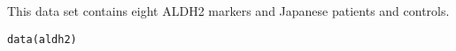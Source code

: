 \documentclass[a4paper]{book}
\begin{document}
\chapter*{}
\begin{center}
{\textbf{\huge {}} \par{}}
\par\bigskip{\large \today}
\end{center}
\Header{}{}

\begin{Description}\relax
This data set contains eight ALDH2 markers 
and Japanese patients and controls.\end{Description}
\begin{Usage}
\begin{verbatim}data(aldh2)\end{verbatim}
\end{Usage}
\end{document}
